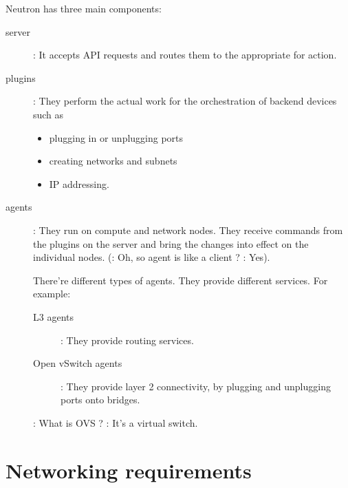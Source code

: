 Neutron has three main components:

\begin{description}
\item[server] : It accepts API requests and routes them to the appropriate
   for action.
\item[plugins] : They perform the actual work for the orchestration of backend devices such as
  \begin{itemize}
  \item plugging in or unplugging ports
  \item creating networks and subnets
  \item IP addressing.
  \end{itemize}
\item[agents] : They run on compute and network nodes. They receive commands
  from the plugins on the server and bring the changes into effect on the
  individual nodes. (: Oh, so agent is like a client ?
  : Yes).

  There're different types of agents. They provide different services. For example:
  \begin{description}
  \item[L3 agents] : They provide routing services.
  \item[Open vSwitch agents] : They provide layer 2 connectivity, by plugging
    and unplugging ports onto  bridges.
  \end{description}
  : What is OVS ? : It's a virtual switch.

\end{description}


\section{Networking requirements}



